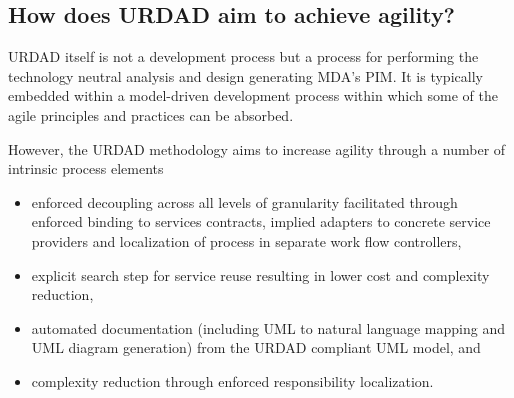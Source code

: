 
\subsection{How does URDAD aim to achieve agility?}

URDAD itself is not a development process but a process for performing
the technology neutral analysis and design generating MDA's PIM. It is
typically embedded within a model-driven development process within
which some of the agile principles and practices can be absorbed. 

However, the URDAD methodology aims to increase
agility through a number of intrinsic process elements
\begin{itemize}
  \item enforced decoupling across all levels of granularity facilitated
			through enforced binding to services contracts, implied adapters
			to concrete service providers and localization of process in
			separate work flow controllers,
  \item explicit search step for service reuse resulting in lower cost and complexity reduction, 
  \item automated documentation (including UML to natural language mapping
			and UML diagram generation) from the URDAD compliant UML model, and
  \item complexity reduction through enforced responsibility localization.
\end{itemize}

